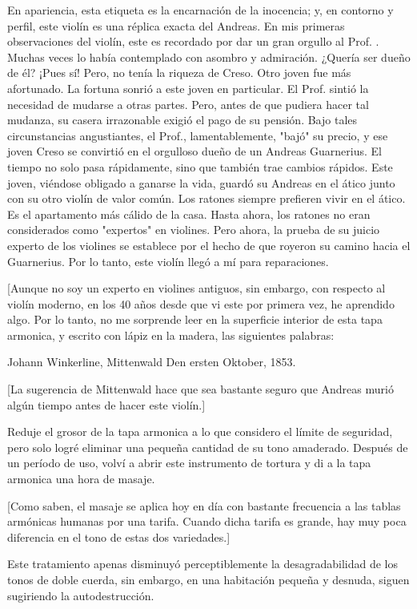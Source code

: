 \documentclass[12pt]{book}
\begin{document}
En apariencia, esta etiqueta es la encarnación de la inocencia; y, en contorno y perfil, este violín es una réplica exacta del Andreas. En mis primeras observaciones del violín, este es recordado por dar un gran orgullo al Prof. . Muchas veces lo había contemplado con asombro y admiración. ¿Quería ser dueño de él? ¡Pues sí! Pero, no tenía la riqueza de Creso. Otro joven fue más afortunado. La fortuna sonrió a este joven en particular. El Prof. sintió la necesidad de mudarse a otras partes. Pero, antes de que pudiera hacer tal mudanza, su casera irrazonable exigió el pago de su pensión. Bajo tales circunstancias angustiantes, el Prof., lamentablemente, "bajó" su precio, y ese joven Creso se convirtió en el orgulloso dueño de un Andreas Guarnerius. El tiempo no solo pasa rápidamente, sino que también trae cambios rápidos. Este joven, viéndose obligado a ganarse la vida, guardó su Andreas en el ático junto con su otro violín de valor común. Los ratones siempre prefieren vivir en el ático. Es el apartamento más cálido de la casa. Hasta ahora, los ratones no eran considerados como "expertos" en violines. Pero ahora, la prueba de su juicio experto de los violines se establece por el hecho de que royeron su camino hacia el Guarnerius. Por lo tanto, este violín llegó a mí para reparaciones.

[Aunque no soy un experto en violines antiguos, sin embargo, con respecto al violín moderno, en los 40 años desde que vi este por primera vez, he aprendido algo. Por lo tanto, no me sorprende leer en la superficie interior de esta tapa armonica, y escrito con lápiz en la madera, las siguientes palabras:

Johann Winkerline, Mittenwald Den ersten Oktober, 1853.

[La sugerencia de Mittenwald hace que sea bastante seguro que Andreas murió algún tiempo antes de hacer este violín.]

Reduje el grosor de la tapa armonica a lo que considero el límite de seguridad, pero solo logré eliminar una pequeña cantidad de su tono amaderado. Después de un período de uso, volví a abrir este instrumento de tortura y di a la tapa armonica una hora de masaje.

[Como saben, el masaje se aplica hoy en día con bastante frecuencia a las tablas armónicas humanas por una tarifa. Cuando dicha tarifa es grande, hay muy poca diferencia en el tono de estas dos variedades.]

Este tratamiento apenas disminuyó perceptiblemente la desagradabilidad de los tonos de doble cuerda, sin embargo, en una habitación pequeña y desnuda, siguen sugiriendo la autodestrucción.
\end{document}
